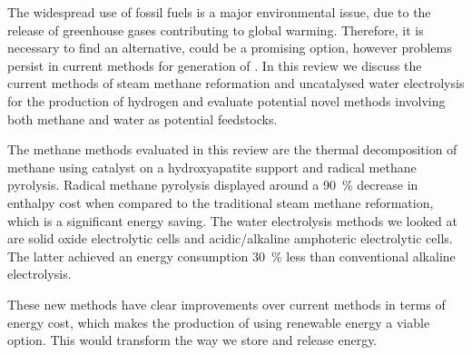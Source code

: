 The widespread use of fossil fuels is a major environmental issue, due to the release of greenhouse gases contributing to global warming.
Therefore, it is necessary to find an alternative,  could be a promising option, however problems persist in current methods for generation of .
In this review we discuss the current methods of steam methane reformation and uncatalysed water electrolysis for the production of hydrogen and evaluate potential novel methods involving both methane and water as potential feedstocks.

The methane methods evaluated in this review are the thermal decomposition of methane using  catalyst on a hydroxyapatite support and radical methane pyrolysis.
Radical methane pyrolysis displayed around a \SI{90}{\percent} decrease in enthalpy cost when compared to the traditional steam methane reformation, which is a significant energy saving.
The water electrolysis methods we looked at are solid oxide electrolytic cells and acidic/alkaline amphoteric electrolytic cells.
The latter achieved an energy consumption \SI{30}{\percent} less than conventional alkaline electrolysis.

These new methods have clear improvements over current methods in terms of energy cost, which makes the production of  using renewable energy a viable option.
This would transform the way we store and release energy.

